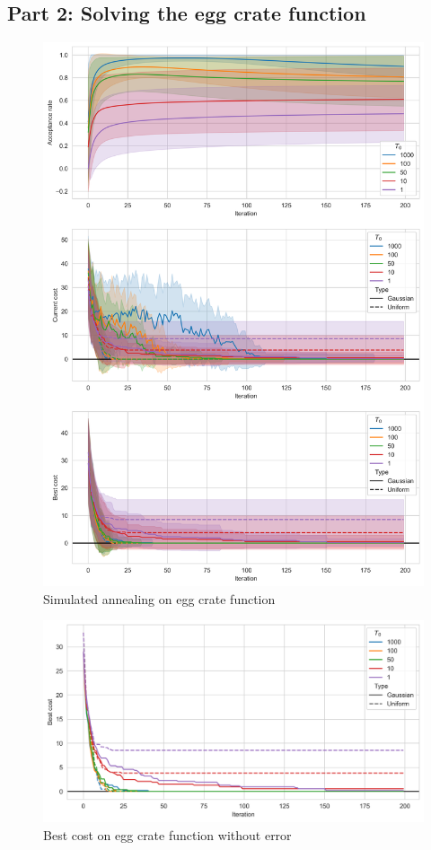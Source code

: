 \phantom{line}

\subsection*{Part 2: Solving the egg crate function}

\begin{figure}
    \centering
    \includegraphics[width=\textwidth]{images/cont_sa.png}
    \caption{Simulated annealing on egg crate function}
    \label{fig:cont-sa}
\end{figure}

\begin{figure}
    \centering
    \includegraphics[width=\textwidth]{images/cont_sa_noerr.png}
    \caption{Best cost on egg crate function without error}
    \label{fig:cont-sa-noerr}
\end{figure}

